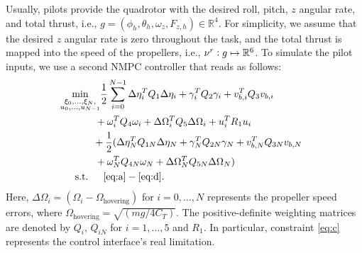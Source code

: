 Usually, pilots provide the quadrotor with the desired roll, pitch, $z$ angular rate, and total thrust, i.e., $g = (\phi_h,\theta_h,\omega_z, F_{z,h}) \in \mathbb{R}^4$. For simplicity, we assume that the desired $z$ angular rate is zero throughout the task, and the total thrust is mapped into the speed of the propellers, i.e., $\nu^r \vcentcolon g \mapsto \mathbb{R}^6$. To simulate the pilot inputs, we use a second NMPC controller that reads as follows:
\begin{equation}\label{eq:nlp}
{\!\!\!\!\!}{\!\!}\begin{aligned}
&\underset{\begin{subarray}{c}
\xi_0, \dots, \xi_N, \\
u_0, \dots, u_{N-1}
\end{subarray}}{\min} \frac{1}{2}\sum_{i=0}^{N-1} \Delta\eta_i^TQ_1\Delta\eta_i + \gamma_i^TQ_2\gamma_i + v_{b,i}^TQ_3v_{b,i} \\
&\,\,\,\,\,\,\,\,\,\,\,\,\,\,\,\,\,\,\,\,\, + \omega_i^TQ_4\omega_i + \Delta\Omega_i^TQ_5\Delta\Omega_i+u_i^TR_1u_i\\ 
& \,\,\,\,\,\,\,\,\,\,\,\,\,\,\,\,\,\,\,\, + \frac{1}{2}(\Delta\eta_N^TQ_{1N}\Delta\eta_N + \gamma_N^TQ_{2N}\gamma_N + v_{b,N}^TQ_{3N}v_{b,N} \\
&\,\,\,\,\,\,\,\,\,\,\,\,\,\,\,\,\,\,\,\,\, + \omega_N^TQ_{4N}\omega_N + \Delta\Omega_N^TQ_{5N}\Delta\Omega_N)\\
&\,\,\,\quad \text{s.t.} \,\,\,\,\,\,\,\,\, \eqref{eq:a}-\eqref{eq:d}.
\end{aligned}{\!\!\!}
\end{equation}
Here, $\Delta\Omega_i = (\Omega_i-\Omega_{\text{hovering}})$ for $i=0,\dots, N$ represents the propeller speed errors, where  $\Omega_{\text{hovering}} = \sqrt{(mg/4C_T)}$. The positive-definite weighting matrices are denoted by $Q_i, \,Q_{iN}$ for $i=1,\dots,5$ and $R_1$. In particular, constraint \eqref{eq:c} represents the control interface's real limitation. 

